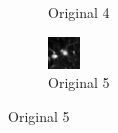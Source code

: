 \begin{figure}[htbp]
\begin{subfigure}[b]{0.18\textwidth}
        \caption*{Original 4}
    \end{subfigure}
    \begin{subfigure}[b]{0.18\textwidth}
        \centering
        \includegraphics[width=\linewidth]{figures/heatmaps/ex5/sample_original.png}
        \caption*{Original 5}
    \end{subfigure}

    \vspace{2mm}


\end{figure}
